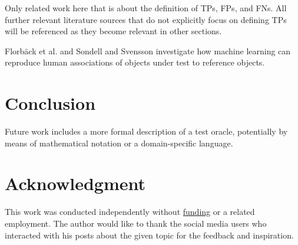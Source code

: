 \documentclass[conference]{IEEEtran}
\begin{document}
Only related work here that is about the definition of TPs, FPs, and FNs. 
All further relevant literature sources that do not explicitly focus on defining TPs will be referenced as they become relevant in other sections. 

Florbäck et al. \cite{Florbaeck2016.matching.offline} and Sondell and Svensson \cite{Sondell2018} investigate how machine learning can reproduce human associations of objects under test to reference objects.


\section{Conclusion}
\label{sec:conclusion}

Future work includes a more formal description of a test oracle, potentially by means of mathematical notation or a domain-specific language.

\section*{Acknowledgment}
\label{sec:acknowledgment}

This work was conducted independently without \href{https://ko-fi.com/michaelhoss}{funding} or a related employment. 
The author would like to thank the social media users who interacted with his posts about the given topic for the feedback and inspiration.

%
% 
% 
% 
% 
% 


{\small


}
\end{document}
